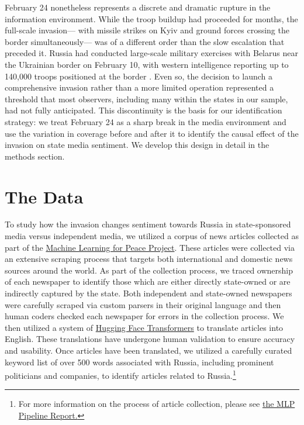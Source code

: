 \documentclass[12pt]{article}
\begin{document}
February 24 nonetheless represents a discrete and dramatic rupture in the information environment. While the troop buildup had proceeded for months, the full-scale invasion--- with missile strikes on Kyiv and ground forces crossing the border simultaneously--- was of a different order than the slow escalation that preceded it. Russia had conducted large-scale military exercises with Belarus near the Ukrainian border on February 10, with western intelligence reporting up to 140,000 troops positioned at the border \citep{walker_conflict_2024}. Even so, the decision to launch a comprehensive invasion rather than a more limited operation represented a threshold that most observers, including many within the states in our sample, had not fully anticipated. This discontinuity is the basis for our identification strategy: we treat February 24 as a sharp break in the media environment and use the variation in coverage before and after it to identify the causal effect of the invasion on state media sentiment. We develop this design in detail in the methods section.

\section*{The Data}

To study how the invasion changes sentiment towards Russia in state-sponsored media versus independent media, we utilized a corpus of news articles collected as part of the \href{https://web.sas.upenn.edu/mlp-devlab/}{Machine Learning for Peace Project}. These articles were collected via an extensive scraping process that targets both international and domestic news sources around the world. As part of the collection process, we traced ownership of each newspaper to identify those which are either directly state-owned or are indirectly captured by the state. Both independent and state-owned newspapers were carefully scraped via custom parsers in their original language and then human coders checked each newspaper for errors in the collection process. We then utilized a system of \href{https://huggingface.co/}{Hugging Face Transformers} to translate articles into English. These translations have undergone human validation to ensure accuracy and usability. Once articles have been translated, we utilized a carefully curated keyword list of over 500 words associated with Russia, including prominent politicians and companies, to identify articles related to Russia.\footnote{For more information on the process of article collection, please see \href{https://web.sas.upenn.edu/mlp-devlab/technical-details-research/}{the MLP Pipeline Report.}}
\end{document}
